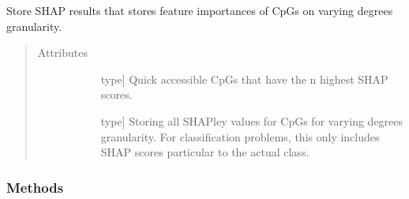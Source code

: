 \documentclass[letterpaper,10pt,english]{sphinxmanual}
\begin{document}
\begin{fulllineitems}
\label{\detokenize{index:methylnet.interpretation_classes.ShapleyData}}
Store SHAP results that stores feature importances of CpGs on varying degrees granularity.
\begin{quote}\begin{description}
\item[{Attributes}] \leavevmode\begin{description}
\item[{}] \leavevmode{[}type{]}
Quick accessible CpGs that have the n highest SHAP scores.

\item[{}] \leavevmode{[}type{]}
Storing all SHAPley values for CpGs for varying degrees granularity. For classification problems, this only includes SHAP scores particular to the actual class.

\end{description}

\end{description}\end{quote}
\subsubsection*{Methods}


\begin{savenotes}\sphinxatlongtablestart\begin{longtable}{}
\hline

\endfirsthead

%
{}\\
\hline

\endhead

\hline
{}\\
\endfoot

\endlastfoot


\end{longtable}
\end{savenotes}
\end{fulllineitems}
\end{document}
